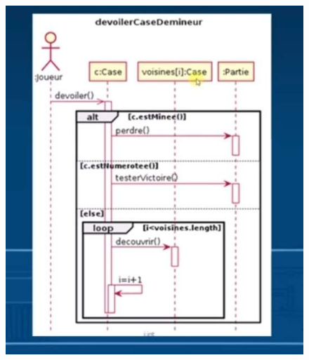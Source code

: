 \documentclass[12pt]{article}
\begin{document}
\begin{figure}[!hbtp]
	\centering
	\includegraphics[scale=0.5]{Capture12.jpg}
\end{figure}
\end{document}
